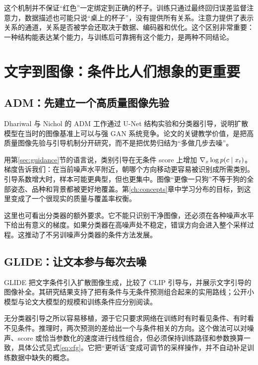 这个机制并不保证“红色”一定绑定到正确的杯子。训练只通过最终回归误差监督注意力，数据描述也可能只说“桌上的杯子”，没有提供所有关系。注意力提供了表示关系的通道，关系是否被学会还取决于数据、编码器和优化。这个区别非常重要：一种结构能表达某个能力，与训练后可靠拥有这个能力，是两种不同结论。

\section{文字到图像：条件比人们想象的更重要}
\label{sec:application-textimage}

\subsection{ADM：先建立一个高质量图像先验}

Dhariwal 与 Nichol 的 ADM 工作通过 U-Net 结构实验和分类器引导，说明扩散模型在当时的图像基准上可以与强 GAN 系统竞争。论文的关键教学价值，是把高质量图像先验与引导机制分开研究，而不是把优势归结为“多做几步去噪”。\cite{a_adm}

用第\ref{sec:guidance}节的语言说，类别引导在无条件 score 上增加 $\nabla_x\log p(c\mid x_t)$。梯度告诉我们：在当前噪声水平附近，朝哪个方向移动更容易被识别成所需类别。引导系数增大时，样本可能更典型，但也更集中。图像“更像一只狗”不等于狗的全部姿态、品种和背景都被更好地覆盖。第\ref{ch:concepts}章中学习分布的目标，到这里变成了一个很现实的质量与覆盖率权衡。

这里也可看出分类器的额外要求。它不能只识别干净图像，还必须在各种噪声水平下给出有意义的梯度。如果分类器在高噪声处不稳定，错误方向会进入整个采样过程。这推动了不另训噪声分类器的条件方法发展。

\subsection{GLIDE：让文本参与每次去噪}

GLIDE 把文字条件引入扩散图像生成，比较了 CLIP 引导与，并展示文字引导的图像补全。其研究结果支持了把有条件与无条件预测组合起来的实用路线；公开小模型与论文大模型的规模和训练条件应分别阅读。\cite{a_glide}

无分类器引导之所以容易移植，源于它只要求网络在训练时有时看见条件、有时看不见条件。推理时，两次预测的差给出一个与条件相关的方向。这个做法可以对噪声、score 或恰当参数化的速度进行线性组合，但必须保持训练路径和参数换算一致，具体公式见式\eqref{eq:cfg}。它把“更听话”变成可调节的采样操作，并不自动补足训练数据中缺失的概念。

